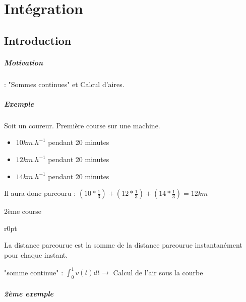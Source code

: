 \chapter{Intégration}
\section{Introduction}

\paragraph{Motivation} : "Sommes continues" et Calcul d'aires.
\paragraph{Exemple} Soit un coureur.
Première course sur une machine.
\begin{itemize}
	\item $10km.h^{-1}$ pendant 20 minutes
	\item $12km.h^{-1}$ pendant 20 minutes
	\item $14km.h^{-1}$ pendant 20 minutes
\end{itemize}

Il aura donc parcouru : $(10*\frac{1}{3})+(12*\frac{1}{3})+(14*\frac{1}{3}) = 12 km$

2ème course

\begin{wrapfigure}[4]{r}{0pt}
\end{wrapfigure}

La distance parcourue est la somme de la distance parcourue instantanément pour chaque instant.

"somme continue" : $\int_0^1 v(t)dt \rightarrow $ Calcul de l'air sous la courbe

\paragraph{2ème exemple}

